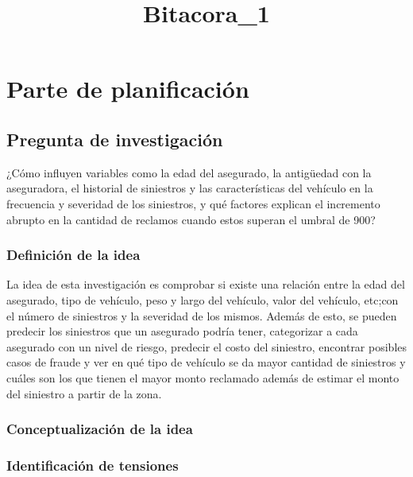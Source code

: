 \documentclass[
  spanish,
  11pt,
  letterpaper,
]{article}
\title{Bitacora\_1}
\author{}
\date{}
\renewcommand*\contentsname{Tabla de contenidos}
\newcommand\contentsname{Tabla de contenidos}
\begin{document}
\maketitle

\renewcommand*\contentsname{Índice}
{
\hypersetup{linkcolor=black}
\setcounter{tocdepth}{3}
\tableofcontents
}

\newpage

\section{Parte de planificación}\label{parte-de-planificaciuxf3n}

\subsection{Pregunta de
investigación}\label{pregunta-de-investigaciuxf3n}

¿Cómo influyen variables como la edad del asegurado, la antigüedad con
la aseguradora, el historial de siniestros y las características del
vehículo en la frecuencia y severidad de los siniestros, y qué factores
explican el incremento abrupto en la cantidad de reclamos cuando estos
superan el umbral de 900?

\subsubsection{Definición de la idea}\label{definiciuxf3n-de-la-idea}

La idea de esta investigación es comprobar si existe una relación entre
la edad del asegurado, tipo de vehículo, peso y largo del vehículo,
valor del vehículo, etc;con el número de siniestros y la severidad de
los mismos. Además de esto, se pueden predecir los siniestros que un
asegurado podría tener, categorizar a cada asegurado con un nivel de
riesgo, predecir el costo del siniestro, encontrar posibles casos de
fraude y ver en qué tipo de vehículo se da mayor cantidad de siniestros
y cuáles son los que tienen el mayor monto reclamado además de estimar
el monto del siniestro a partir de la zona.

\subsubsection{Conceptualización de la
idea}\label{conceptualizaciuxf3n-de-la-idea}

\subsubsection{Identificación de
tensiones}\label{identificaciuxf3n-de-tensiones}
\end{document}
